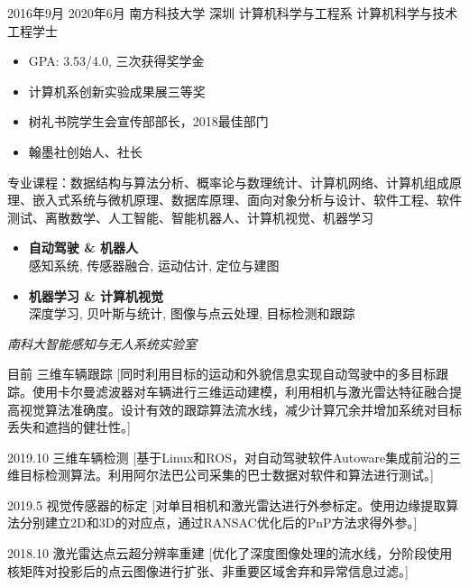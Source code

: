 \documentclass[zh]{resume}
\begin{document}
\makeheader

\begin{educations}
  \education%
    {2016年9月}%
    {2020年6月}%
    {南方科技大学}%
    {深圳}%
    {计算机科学与工程系}%
    {计算机科学与技术}%
    {工程学士}%
	{\begin{itemize}%
		\item GPA: 3.53/4.0, 三次获得奖学金
		\item 计算机系创新实验成果展三等奖
		\item 树礼书院学生会宣传部部长，2018最佳部门
		\item 翰墨社创始人、社长
	\end{itemize}
	专业课程：数据结构与算法分析、概率论与数理统计、计算机网络、计算机组成原理、嵌入式系统与微机原理、数据库原理、面向对象分析与设计、软件工程、软件测试、离散数学、人工智能、智能机器人、计算机视觉、机器学习
	}%
\end{educations}

\begin{itemize}
  \item \textbf{自动驾驶 \& 机器人}\\
  	感知系统, 传感器融合, 运动估计, 定位与建图
  \item \textbf{机器学习 \& 计算机视觉}\\
  	深度学习, 贝叶斯与统计, 图像与点云处理, 目标检测和跟踪
\end{itemize}


\textit{南科大智能感知与无人系统实验室}

\begin{experiences}
  \experience%
    {目前}%
    {三维车辆跟踪}%
    [同时利用目标的运动和外貌信息实现自动驾驶中的多目标跟踪。使用卡尔曼滤波器对车辆进行三维运动建模，利用相机与激光雷达特征融合提高视觉算法准确度。设计有效的跟踪算法流水线，减少计算冗余并增加系统对目标丢失和遮挡的健壮性。]

\separator{0.5ex}
  \experience%
    {2019.10}%
    {三维车辆检测}%
    [基于Linux和ROS，对自动驾驶软件Autoware集成前沿的三维目标检测算法。利用阿尔法巴公司采集的巴士数据对软件和算法进行测试。] 

\separator{0.5ex}
  \experience%
    {2019.5}%
    {视觉传感器的标定}%
    [对单目相机和激光雷达进行外参标定。使用边缘提取算法分别建立2D和3D的对应点，通过RANSAC优化后的PnP方法求得外参。]

\separator{0.5ex}
  \experience%
    {2018.10}%
    {激光雷达点云超分辨率重建}%
    [优化了深度图像处理的流水线，分阶段使用核矩阵对投影后的点云图像进行扩张、非重要区域舍弃和异常信息过滤。]   
    

\end{experiences}
\end{document}
